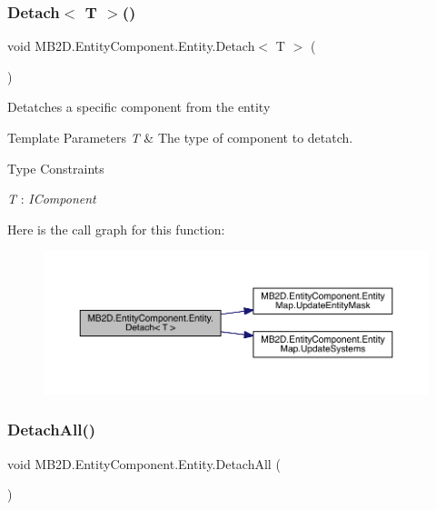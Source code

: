 \subsubsection{\texorpdfstring{Detach$<$ T $>$()}{Detach< T >()}}
{\footnotesize\ttfamily void M\+B2\+D.\+Entity\+Component.\+Entity.\+Detach$<$ T $>$ (\begin{DoxyParamCaption}{ }\end{DoxyParamCaption})\hspace{0.3cm}{\ttfamily [inline]}}



Detatches a specific component from the entity 


\begin{DoxyTemplParams}{Template Parameters}
{\em T} & The type of component to detatch.\\
\hline
\end{DoxyTemplParams}
\begin{Desc}
\item[Type Constraints]\begin{description}
\item[{\em T} : {\em I\+Component}]\end{description}
\end{Desc}
Here is the call graph for this function\+:\nopagebreak
\begin{figure}[H]
\begin{center}
\leavevmode
\includegraphics[width=350pt]{class_m_b2_d_1_1_entity_component_1_1_entity_a9194f3b1f3370d2ecb47efe077ba4050_cgraph}
\end{center}
\end{figure}
\hypertarget{class_m_b2_d_1_1_entity_component_1_1_entity_a5c006a368383ba7b17653d9f958ceaf8}{}\label{class_m_b2_d_1_1_entity_component_1_1_entity_a5c006a368383ba7b17653d9f958ceaf8} 
\subsubsection{\texorpdfstring{Detach\+All()}{DetachAll()}}
{\footnotesize\ttfamily void M\+B2\+D.\+Entity\+Component.\+Entity.\+Detach\+All (\begin{DoxyParamCaption}{ }\end{DoxyParamCaption})\hspace{0.3cm}{\ttfamily [inline]}}



